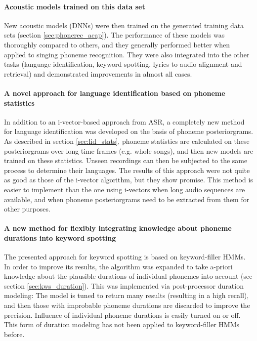 \paragraph{Acoustic models trained on this data set}
New acoustic models (DNNs) were then trained on the generated training data sets (section \ref{sec:phonerec_acap}). The performance of these models was thoroughly compared to others, and they generally performed better when applied to singing phoneme recognition. They were also integrated into the other tasks (language identification, keyword spotting, lyrics-to-audio alignment and retrieval) and demonstrated improvements in almost all cases.

\paragraph{A novel approach for language identification based on phoneme statistics}
In addition to an i-vector-based approach from ASR, a completely new method for language identification was developed on the basis of phoneme posteriorgrams. As described in section \ref{sec:lid_stats}, phoneme statistics are calculated on these posteriorgrams over long time frames (e.g. whole songs), and then new models are trained on these statistics. Unseen recordings can then be subjected to the same process to determine their languages. The results of this approach were not quite as good as those of the i-vector algorithm, but they show promise. This method is easier to implement than the one using i-vectors when long audio sequences are available, and when phoneme posteriorgrams need to be extracted from them for other purposes.

\paragraph{A new method for flexibly integrating knowledge about phoneme durations into keyword spotting}
The presented approach for keyword spotting is based on keyword-filler HMMs. In order to improve its results, the algorithm was expanded to take a-priori knowledge about the plausible durations of individual phonemes into account (see section \ref{sec:kws_duration}). This was implemented via post-processor duration modeling: The model is tuned to return many results (resulting in a high recall), and then those with improbable phoneme durations are discarded to improve the precision. Influence of individual phoneme durations is easily turned on or off.  This form of duration modeling has not been applied to keyword-filler HMMs before. 

